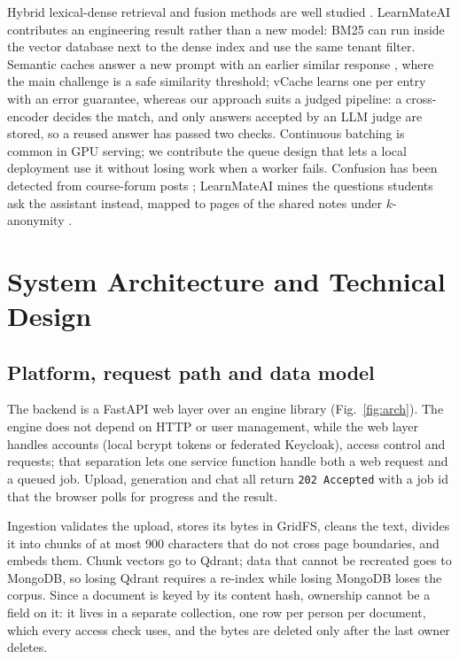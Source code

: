 \documentclass[conference]{IEEEtran}
\newcommand{\sys}{LearnMateAI}
\begin{document}
Hybrid lexical-dense retrieval and fusion methods are well studied \cite{cormack2009rrf}. \sys{} contributes an
engineering result rather than a new model: BM25 can run inside the vector database next to the dense index and
use the same tenant filter.
Semantic caches answer a new prompt with an earlier similar response \cite{bang2023gptcache}, where the main
challenge is a safe similarity threshold; vCache \cite{schroeder2025vcache} learns one per entry with an
error guarantee, whereas our approach suits a judged pipeline: a cross-encoder decides the match, and only
answers accepted by an LLM judge \cite{zheng2023judge} are stored, so a reused answer has passed two checks.
Continuous batching \cite{yu2022orca} is common in GPU serving; we contribute the queue design that lets a
local deployment use it without losing work when a worker fails. Confusion has been detected from course-forum
posts \cite{yang2015confusion}; \sys{} mines the questions students ask the assistant instead, mapped to pages
of the shared notes under $k$-anonymity \cite{sweeney2002kanon}.

\section{System Architecture and Technical Design}

\subsection{Platform, request path and data model}

The backend is a FastAPI web layer over an engine library (Fig.~\ref{fig:arch}). The engine does not
depend on HTTP or user management, while the web layer handles accounts (local bcrypt tokens or federated
Keycloak), access control and requests; that separation lets one service function handle both a web request
and a queued job. Upload, generation and chat all return \texttt{202 Accepted} with a job id that the browser
polls for progress and the result.

Ingestion validates the upload, stores its bytes in GridFS, cleans the text, divides it into chunks of at
most 900 characters that do not cross page boundaries, and embeds them. Chunk vectors go to Qdrant; data
that cannot be recreated goes to MongoDB, so losing Qdrant requires a re-index while losing MongoDB loses
the corpus. Since a document is keyed by its content hash, ownership cannot be a field on it: it lives in a
separate collection, one row per person per document, which every access check uses, and the bytes are
deleted only after the last owner deletes.
\end{document}
